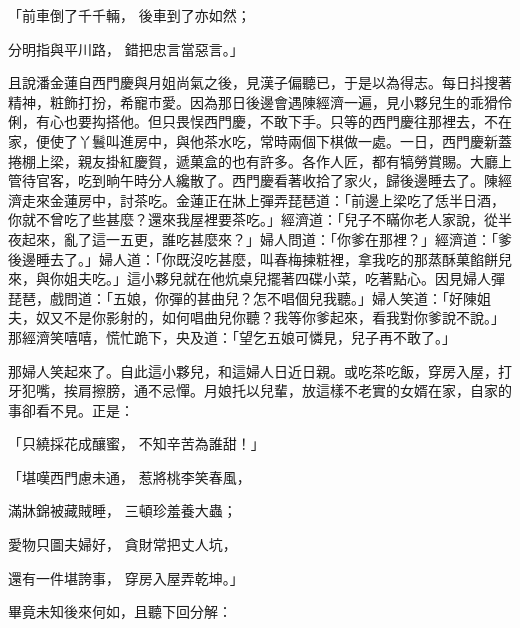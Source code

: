 「前車倒了千千輛，  後車到了亦如然；

分明指與平川路，  錯把忠言當惡言。」

且說潘金蓮自西門慶與月姐尚氣之後，見漢子偏聽已，于是以為得志。每日抖搜著精神，粧飾打扮，希寵巿愛。因為那日後邊會遇陳經濟一遍，見小夥兒生的乖猾伶俐，有心也要抅搭他。但只畏悮西門慶，不敢下手。只等的西門慶往那裡去，不在家，便使了丫鬟叫進房中，與他茶水吃，常時兩個下棋做一處。一日，西門慶新蓋捲棚上梁，親友掛紅慶賀，遞菓盒的也有許多。各作人匠，都有犒勞賞賜。大廳上管待官客，吃到晌午時分人纔散了。西門慶看著收拾了家火，歸後邊睡去了。陳經濟走來金蓮房中，討茶吃。金蓮正在牀上彈弄琵琶道：「前邊上梁吃了恁半日酒，你就不曾吃了些甚麼？還來我屋裡要茶吃。」經濟道：「兒子不瞞你老人家說，從半夜起來，亂了這一五更，誰吃甚麼來？」婦人問道：「你爹在那裡？」經濟道：「爹後邊睡去了。」婦人道：「你既沒吃甚麼，叫春梅揀粧裡，拿我吃的那蒸酥菓餡餅兒來，與你姐夫吃。」這小夥兒就在他炕桌兒擺著四碟小菜，吃著點心。因見婦人彈琵琶，戲問道：「五娘，你彈的甚曲兒？怎不唱個兒我聽。」婦人笑道：「好陳姐夫，奴又不是你影射的，如何唱曲兒你聽？我等你爹起來，看我對你爹說不說。」那經濟笑嘻嘻，慌忙跪下，央及道：「望乞五娘可憐見，兒子再不敢了。」

那婦人笑起來了。自此這小夥兒，和這婦人日近日親。或吃茶吃飯，穿房入屋，打牙犯嘴，挨肩擦膀，通不忌憚。月娘托以兒輩，放這樣不老實的女婿在家，自家的事卻看不見。正是：

「只繞採花成釀蜜，  不知辛苦為誰甜！」

「堪嘆西門慮未通，  惹將桃李笑春風，

滿牀錦被藏賊睡，  三頓珍羞養大蟲；

愛物只圖夫婦好，  貪財常把丈人坑，

還有一件堪誇事，  穿房入屋弄乾坤。」

畢竟未知後來何如，且聽下回分解：
